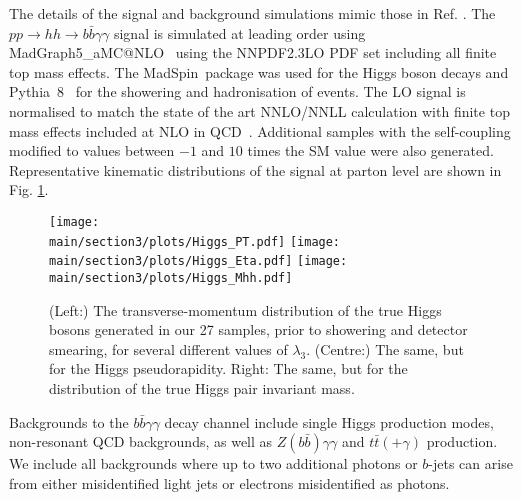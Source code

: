 The details of the signal and background simulations mimic those in Ref. \cite{Homiller:2018dgu}. 
The $pp \rightarrow hh \rightarrow b\bar{b}\gamma\gamma$ signal is simulated at leading order using {\sc\small MadGraph5\_aMC@NLO}\ \cite{Alwall:2014hca, Hirschi:2015iia} using the NNPDF2.3LO PDF set \cite{Ball:2014uwa} including all finite top mass effects. The {\sc\small MadSpin}\ package \cite{Artoisenet:2012st} was used for the Higgs boson decays and {\sc\small Pythia~8}\ \cite{Sjostrand:2014zea} for the showering and hadronisation of events. The LO signal is normalised to match the state of the art NNLO/NNLL calculation with finite top mass effects included at NLO in QCD~\cite{Grazzini:2018bsd}. Additional samples with the self-coupling modified to values between $-1$ and $10$ times the SM value were also generated. Representative kinematic distributions of the signal at parton level are shown in Fig. \ref{fig:dihiggs_kinematics}.

\begin{figure}[h]
\centering
	\texttt{[image: \\main/section3/plots/Higgs\_PT.pdf]}
	\hfill
	\texttt{[image: \\main/section3/plots/Higgs\_Eta.pdf]}
	\hfill
	\texttt{[image: \\main/section3/plots/Higgs\_Mhh.pdf]}
\caption{(Left:) The transverse-momentum distribution of the true Higgs bosons generated in our 27 \UTeV samples, prior to showering and detector smearing, for several different values of $\lambda_3$. (Centre:) The same, but for the Higgs pseudorapidity. Right: The same, but for the distribution of the true Higgs pair invariant mass.}\label{fig:dihiggs_kinematics}
\end{figure}

Backgrounds to the $b\bar{b}\gamma\gamma$ decay channel include single Higgs production modes, non-resonant QCD backgrounds, as well as $Z(b\bar{b})\gamma\gamma$ and $t\bar{t}(+\gamma)$ production. We include all backgrounds where up to two additional photons or $b$-jets can arise from either misidentified light jets or electrons misidentified as photons.

